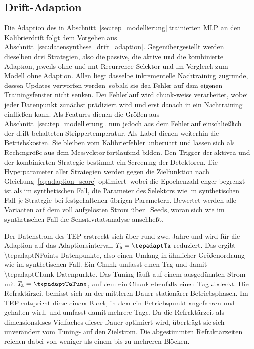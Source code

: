 \subsection{Drift-Adaption} \label{sec:tep_adaption}
%

%
Die Adaption des in Abschnitt~\ref{sec:tep_modellierung} trainierten \ac{MLP} an den Kalibrierdrift folgt dem Vorgehen aus Abschnitt~\ref{sec:datensynthese_drift_adaption}. Gegenübergestellt werden dieselben drei Strategien, also die passive, die aktive und die kombinierte Adaption, jeweils ohne und mit Recurrence-Selektor und im Vergleich zum Modell ohne Adaption. Allen liegt dasselbe inkrementelle Nachtraining zugrunde, dessen Updates verworfen werden, sobald sie den Fehler auf dem eigenen Trainingsfenster nicht senken. Der Fehlerlauf wird chunk-weise verarbeitet, wobei jeder Datenpunkt zunächst prädiziert wird und erst danach in ein Nachtraining einfließen kann. Als Features dienen die Größen aus Abschnitt~\ref{sec:tep_modellierung}, nun jedoch aus dem Fehlerlauf einschließlich der drift-behafteten Strippertemperatur. Als Label dienen weiterhin die Betriebskosten. Sie bleiben vom Kalibrierfehler unberührt und lassen sich als Rechengröße aus dem Messvektor fortlaufend bilden. Den Trigger der aktiven und der kombinierten Strategie bestimmt ein Screening der Detektoren. Die Hyperparameter aller Strategien werden gegen die Zielfunktion nach Gleichung~\eqref{eq:adaption_score} optimiert, wobei die Epochenzahl enger begrenzt ist als im synthetischen Fall, die Parameter des Selektors wie im synthetischen Fall je Strategie bei festgehaltenen übrigen Parametern. Bewertet werden alle Varianten auf dem voll aufgelösten Strom über \tepadaptNSeeds\ Seeds, woran sich wie im synthetischen Fall die Sensitivitätsanalyse anschließt. \par
%
Der Datenstrom des \ac{TEP} erstreckt sich über rund zwei Jahre und wird für die Adaption auf das Adaptionsintervall $T_{\mathrm{a}} = \tepadaptTa$ reduziert. Das ergibt \num{\tepadaptNPoints} Datenpunkte, also einen Umfang in ähnlicher Größenordnung wie im synthetischen Fall. Ein Chunk umfasst einen Tag und damit \num{\tepadaptChunk} Datenpunkte. Das Tuning läuft auf einem ausgedünnten Strom mit $T_{\mathrm{a}} = \tepadaptTaTune$, auf dem ein Chunk ebenfalls einen Tag abdeckt. Die Refraktärzeit bemisst sich an der mittleren Dauer stationärer Betriebsphasen. Im \ac{TEP} entspricht diese einem Block, in dem ein Betriebspunkt angefahren und gehalten wird, und umfasst damit mehrere Tage. Da die Refraktärzeit als dimensionsloses Vielfaches dieser Dauer optimiert wird, überträgt sie sich unverändert vom Tuning- auf den Zielstrom. Die abgestimmten Refraktärzeiten reichen dabei von weniger als einem bis zu mehreren Blöcken. \par
